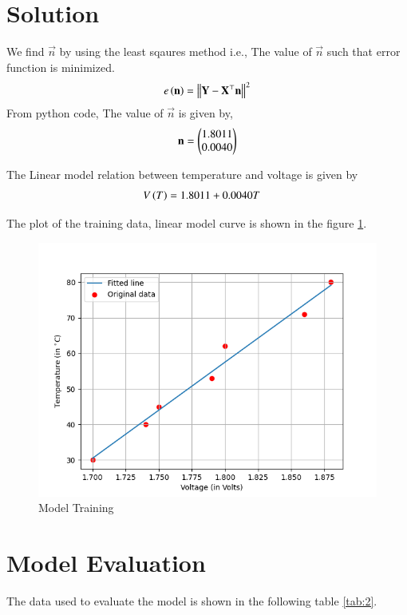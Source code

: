 \documentclass[journal,12pt,twocolumn]{IEEEtran}
\begin{document}
\section{Solution}
We find $\vec{n}$ by using the least sqaures method i.e., The value of $\vec{n}$ such that error function is minimized.
\begin{align}
e\left(\boldsymbol{\mathbf{n}}\right) = \left\lVert\boldsymbol{\mathbf{Y}} - \boldsymbol{\mathbf{X}} ^\top\boldsymbol{\mathbf{n}}\right\rVert^2
\end{align} 
From python code, The value of $\vec{n}$ is given by,
\begin{align}
    \boldsymbol{\mathbf{n}} = \begin{pmatrix}1.8011\\0.0040\end{pmatrix}
    \label{eq:4}
\end{align}

The Linear model relation between temperature and voltage is given by
\begin{align}
V\left(T\right) &= 1.8011 + 0.0040T
    \label{eq:5}
\end{align}

The plot of the training data, linear model curve is shown in the figure \ref{fig:2}.
\begin{figure}[h]
    \centering
    \includegraphics[width=\columnwidth]{figs/Train.png}
    \caption{Model Training}
    \label{fig:2}
\end{figure}

\newpage
\section{Model Evaluation}
The data used to evaluate the model is shown in the following table \ref{tab:2}.
\end{document}
